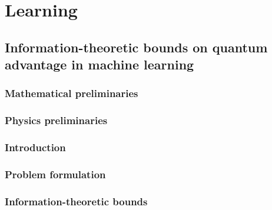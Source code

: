 \documentclass[../../note.tex]{subfiles}
\begin{document}
\chapter{Learning}
\section{Information-theoretic bounds on quantum advantage in machine learning \cite{huang2021information}}

\subsection{Mathematical preliminaries}
\begin{definition}
    
\end{definition}

\begin{theorem}
 
\end{theorem}

\subsection{Physics preliminaries}


\subsection{Introduction}


\subsection{Problem formulation}


\subsection{Information-theoretic bounds}






\end{document}
